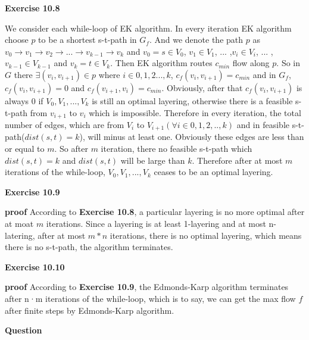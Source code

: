 \documentclass{article} %
\begin{document}
	\textbf{Exercise 10.8}\par
	We consider each while-loop of EK algorithm. In every iteration  EK algorithm choose $p$ to be a shortest s-t-path in $G_{f}$. 
	And we denote the path $p$ as $v_{0}\rightarrow v_{1}\rightarrow v_{2} \rightarrow ...\rightarrow v_{k-1} \rightarrow v_{k} $ and $v_{0}=s\in V_{0}$, $v_{1}\in V_{1}$, ... ,$v_{i}\in V_{i}$, ... ,$v_{k-1}\in V_{k-1}$ and $v_{k}=t\in V_{k}$. Then EK algorithm routes $c_{min}$ flow along $p$. So in $G$ there $\exists (v_{i},v_{i+1})\in p$ where $i\in {0,1,2...,k}$, $c_{f}(v_{i},v_{i+1})=c_{min}$ and in $G_{f}$, $c_{f}(v_{i},v_{i+1})=0$ and  $c_{f}(v_{i+1},v_{i})=c_{min}$. Obviously, after that $c_{f}(v_{i},v_{i+1})$ is always $0$ if  $V_{0},V_{1},...,V_{k}$ is still an optimal layering, otherwise there is a feasible s-t-path from $v_{i+1}$ to $v_{i}$ which is impossible. Therefore in every iteration, the total number of edges, which are from $V_{i}$ to $V_{i+1} (\forall i \in{0,1,2,..,k})$ and in feasible s-t-path($dist(s,t)=k$), will minus at least one. Obviously these edges are less than or equal to $m$. So after $m$ iteration, there no feasible s-t-path which $dist(s,t)=k$ and $dist(s,t)$ will be large than $k$. Therefore after at most $m$ iterations of  the while-loop, $V_{0},V_{1},...,V_{k}$ ceases to be an optimal layering.\par
	
	\textbf{Exercise 10.9}\par
	\textbf{proof} According to \textbf{Exercise 10.8}, a particular layering is no more optimal after at moat $m$ iterations. Since a layering is at least 1-layering and at most n-latering, after at most $m*n$ iterations, there is no optimal layering, which means there is no s-t-path, the algorithm terminates.
	
	
	\textbf{Exercise 10.10}\par
	\textbf{proof} According to \textbf{Exercise 10.9},  the Edmonds-Karp algorithm terminates after n·m iterations of the while-loop, which is to say, we can get the max flow $f$ after finite steps by Edmonds-Karp algorithm.
   
		\textbf{Question}\par
	 
	
\end{document}
